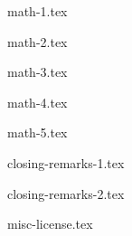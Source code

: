 \documentclass[allauthors]{../../cursuspresentatie}
\def\importslide#1#2{%
	{#2}
}
\begin{document}
\importslide{beginners_NL}{math-1.tex}

\importslide{beginners_NL}{math-2.tex}


\importslide{beginners_NL}{math-3.tex}

\importslide{beginners_NL}{math-4.tex}

\importslide{beginners_NL}{math-5.tex}


\importslide{beginners_NL}{closing-remarks-1.tex}
\importslide{beginners_NL}{closing-remarks-2.tex}
	
\importslide{misc}{misc-license.tex}
\end{document}
